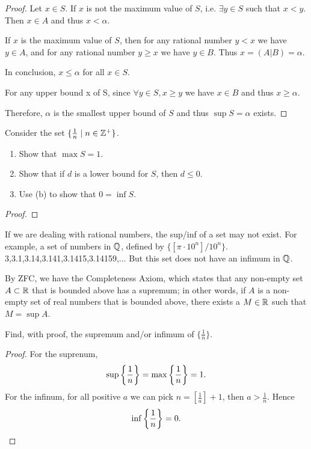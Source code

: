 \begin{proof}
Let $x\in S$. If $x$ is not the maximum value of $S$, i.e. $\exists y \in S$ such that $x<y$. Then $x\in A$ and thus $x<\alpha$.

If $x$ is the maximum value of $S$, then for any rational number $y<x$ we have $y\in A$, and for any rational number $y\ge x$ we have $y\in B$. Thus $x=(A|B)=\alpha$.

In conclusion, $x\le\alpha$ for all $x\in S$.

For any upper bound x of S, since $\forall y\in S, x\ge y$ we have $x\in B$ and thus $x\ge \alpha$.

Therefore, $\alpha$ is the smallest upper bound of $S$ and thus $\sup S=\alpha$ exists.
\end{proof}
\pagebreak

\begin{prbm}
Consider the set $\{\frac{1}{n} \mid n\in\mathbb Z^{+}\}$.
\begin{enumerate}[label=(\alph*)]
\item Show that $\max S = 1$.
\item Show that if $d$ is a lower bound for $S$, then $d \le 0$.
\item Use (b) to show that $0 = \inf S$.
\end{enumerate}
\end{prbm}

\begin{proof}

\end{proof}

If we are dealing with rational numbers, the sup/inf of a set may not exist. For example, a set of numbers in $\mathbb Q$, defined by $\{[\pi\cdot10^n]/10^n\}$.
3,3.1,3.14,3.141,3.1415,3.14159,...
But this set does not have an infimum in $\mathbb Q$.

By ZFC, we have the Completeness Axiom, which states that any non-empty set $A \subset \mathbb R$ that is bounded above has a supremum; in other words, if $A$ is a non-empty set of real numbers that is bounded above, there exists a $M \in \mathbb R$ such that $M = \sup A$.




\begin{prbm}
Find, with proof, the supremum and/or infimum of $\{\frac{1}{n}\}$.
\end{prbm}

\begin{proof}
For the suprenum,
\[ \sup\left\{\frac{1}{n}\right\} = \max\left\{\frac{1}{n}\right\} = 1. \]
For the infinum, for all positive $a$ we can pick $n=[\frac{1}{a}]+1$, then $a>\frac{1}{n}$. Hence 
\[ \inf\left\{\frac{1}{n}\right\}=0. \]
\end{proof}

